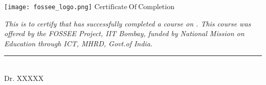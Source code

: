 \documentclass[20pt, a4paper]{extarticle}
\begin{document}
  
\pagestyle{empty}



\begin{minipage}{\linewidth}

\hspace{18 cm}
\texttt{[image: fossee\_logo.png]}
\centering \large \bfseries
{\Huge
\vskip2cm \color{blue!50!black} \hspace{2cm}   $\boldsymbol{\mathrm { Certificate \ Of\    Completion}}$ }
\end{minipage}

\vskip2.5cm
\doublespacing
\RaggedRight
{ \normalsize
{}\selectfont

\normalsize \emph{{\hspace{4cm} This is to certify that {\color {blue!50!black}  }has successfully completed a course on { \color{blue!50!black} }. This course was offered by the {\color{red!50!black} FOSSEE Project, IIT Bombay,} funded by National Mission on Education through ICT, MHRD, Govt.of India.
}}}



\singlespacing
\small


\hspace{3 cm}
\vskip1cm
\begin{minipage}{0.2\linewidth}
\centering
\rule{5cm}{1pt}\\
Dr. XXXXX\\
\end{minipage}\hfill
\end{document}
